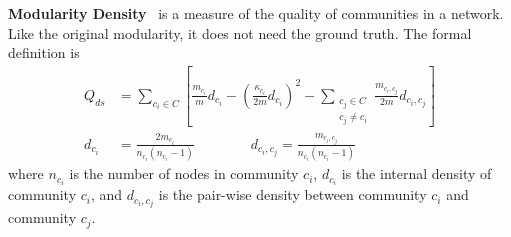 \textbf{Modularity Density}~\cite{chen2014community} is a measure of the quality of communities in a network. Like the original modularity, it does not need the ground truth. The formal definition is
\begin{align}
Q_{ds} &= \sum_{c_i \in C} \left[ \frac{m_{c_i}}{m} d_{c_i} - \left( \frac{\kappa_{c_i}}{2m} d_{c_i} \right)^2 - \sum_{\substack{c_j \in C\\c_j\neq c_i}} \frac{m_{c_i,c_j}}{2m} d_{c_i,c_j}
\right]\\
d_{c_i} &= \frac{2m_{c_i}}{n_{c_i}(n_{c_i}-1)} \quad \quad \quad \quad d_{c_i,c_j} = \frac{m_{c_i,c_j}}{n_{c_i}(n_{c_i}-1)} 
\end{align}
where $n_{c_i}$ is the number of nodes in community $c_i$, $d_{c_i}$ is the internal density of community $c_i$, and $d_{c_i,c_j}$ is the pair-wise density between community $c_i$ and community $c_j$.

